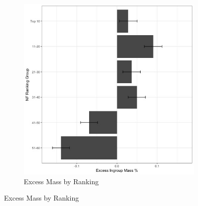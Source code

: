 \documentclass[12pt,letterpaper]{article}
\begin{document}
\begin{figure}[ht]
\begin{subfigure}{.5\textwidth}
        \includegraphics[width=.9\linewidth]{Output/Graphs/Audit/Excess Mass/India NF excess mass by ranking group.jpg}  
        \caption{Excess Mass by Ranking}
        \label{fig:nf_bygroup_em_india}
    \end{subfigure}
\end{figure}
\end{document}
